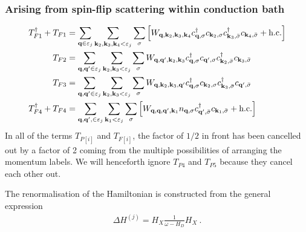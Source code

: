 \documentclass[reprint,hidelinks]{revtex4-2}
\begin{document}
\begin{widetext}
\subsubsection*{Arising from spin-flip scattering within conduction bath}
\begin{equation}\begin{aligned}
	T_{F1}^\dagger + T_{F1} &= \sum_{{\bf q} \in \varepsilon_j}\sum_{{\bf k}_2, {\bf k}_3, {\bf k}_4 < \varepsilon_j}\sum_{\sigma} \left[W_{{\bf q},{\bf k}_2,{\bf k}_3,{\bf k}_4}c^\dagger_{{\bf q},\sigma}c_{{\bf k}_2,\sigma}c^\dagger_{{\bf k}_3,\bar\sigma}c_{{\bf k}_4,\bar\sigma} + \text{h.c.}\right]\\
	T_{F2} &= \sum_{{\bf q}, {\bf q}^\prime \in \varepsilon_j}\sum_{{\bf k}_2, {\bf k}_3 < \varepsilon_j}\sum_{\sigma}W_{{\bf q},{\bf q}^\prime,{\bf k}_2,{\bf k}_3} c^\dagger_{{\bf q},\sigma}c_{{\bf q}^\prime,\sigma}c^\dagger_{{\bf k}_2,\bar\sigma}c_{{\bf k}_3,\bar\sigma}\\
	T_{F3} &= \sum_{{\bf q}, {\bf q}^\prime \in \varepsilon_j}\sum_{{\bf k}_2, {\bf k}_3 < \varepsilon_j}\sum_{\sigma} W_{{\bf q},{\bf k}_2,{\bf k}_3,{\bf q}^\prime} c^\dagger_{{\bf q},\sigma}c_{{\bf k}_2,\sigma}c^\dagger_{{\bf k}_3,\bar\sigma}c_{{\bf q}^\prime,\bar\sigma} \\
	T_{F4}^\dagger + T_{F4} &= \sum_{{\bf q}, {\bf q}^\prime, \in \varepsilon_j}\sum_{{\bf k}_1 < \varepsilon_j}\sum_{\sigma} \left[W_{{\bf q},{\bf q},{\bf q}^{\prime}, {\bf k}_1} n_{{\bf q},\sigma} c^\dagger_{{\bf q}^{\prime},\bar\sigma}c_{{\bf k}_1,\bar\sigma} + \text{h.c.}\right]
\end{aligned}\end{equation}
In all of the terms \(T_{P[i]}\) and \(T_{F[i]}\), the factor of \(1/2\) in front has been cancelled out by a factor of 2 coming from the multiple possibilities of arranging the momentum labels. We will henceforth ignore \(T_{P4}\) and \(T_{P5}\) because they cancel each other out.

The renormalisation of the Hamiltonian is constructed from the general expression
\begin{equation}\begin{aligned}
	\Delta H^{(j)} = H_X \frac{1}{\omega- H_D} H_X~.
\end{aligned}\end{equation}


\end{widetext}
\end{document}
